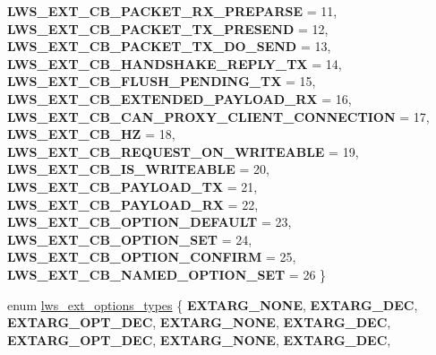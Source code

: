\begin{DoxyCompactItemize}
{\bfseries L\+W\+S\+\_\+\+E\+X\+T\+\_\+\+C\+B\+\_\+\+P\+A\+C\+K\+E\+T\+\_\+\+R\+X\+\_\+\+P\+R\+E\+P\+A\+R\+SE} = 11, 
{\bfseries L\+W\+S\+\_\+\+E\+X\+T\+\_\+\+C\+B\+\_\+\+P\+A\+C\+K\+E\+T\+\_\+\+T\+X\+\_\+\+P\+R\+E\+S\+E\+ND} = 12, 
\newline
{\bfseries L\+W\+S\+\_\+\+E\+X\+T\+\_\+\+C\+B\+\_\+\+P\+A\+C\+K\+E\+T\+\_\+\+T\+X\+\_\+\+D\+O\+\_\+\+S\+E\+ND} = 13, 
{\bfseries L\+W\+S\+\_\+\+E\+X\+T\+\_\+\+C\+B\+\_\+\+H\+A\+N\+D\+S\+H\+A\+K\+E\+\_\+\+R\+E\+P\+L\+Y\+\_\+\+TX} = 14, 
{\bfseries L\+W\+S\+\_\+\+E\+X\+T\+\_\+\+C\+B\+\_\+\+F\+L\+U\+S\+H\+\_\+\+P\+E\+N\+D\+I\+N\+G\+\_\+\+TX} = 15, 
{\bfseries L\+W\+S\+\_\+\+E\+X\+T\+\_\+\+C\+B\+\_\+\+E\+X\+T\+E\+N\+D\+E\+D\+\_\+\+P\+A\+Y\+L\+O\+A\+D\+\_\+\+RX} = 16, 
\newline
{\bfseries L\+W\+S\+\_\+\+E\+X\+T\+\_\+\+C\+B\+\_\+\+C\+A\+N\+\_\+\+P\+R\+O\+X\+Y\+\_\+\+C\+L\+I\+E\+N\+T\+\_\+\+C\+O\+N\+N\+E\+C\+T\+I\+ON} = 17, 
{\bfseries L\+W\+S\+\_\+\+E\+X\+T\+\_\+\+C\+B\+\_\+HZ} = 18, 
{\bfseries L\+W\+S\+\_\+\+E\+X\+T\+\_\+\+C\+B\+\_\+\+R\+E\+Q\+U\+E\+S\+T\+\_\+\+O\+N\+\_\+\+W\+R\+I\+T\+E\+A\+B\+LE} = 19, 
{\bfseries L\+W\+S\+\_\+\+E\+X\+T\+\_\+\+C\+B\+\_\+\+I\+S\+\_\+\+W\+R\+I\+T\+E\+A\+B\+LE} = 20, 
\newline
{\bfseries L\+W\+S\+\_\+\+E\+X\+T\+\_\+\+C\+B\+\_\+\+P\+A\+Y\+L\+O\+A\+D\+\_\+\+TX} = 21, 
{\bfseries L\+W\+S\+\_\+\+E\+X\+T\+\_\+\+C\+B\+\_\+\+P\+A\+Y\+L\+O\+A\+D\+\_\+\+RX} = 22, 
{\bfseries L\+W\+S\+\_\+\+E\+X\+T\+\_\+\+C\+B\+\_\+\+O\+P\+T\+I\+O\+N\+\_\+\+D\+E\+F\+A\+U\+LT} = 23, 
{\bfseries L\+W\+S\+\_\+\+E\+X\+T\+\_\+\+C\+B\+\_\+\+O\+P\+T\+I\+O\+N\+\_\+\+S\+ET} = 24, 
\newline
{\bfseries L\+W\+S\+\_\+\+E\+X\+T\+\_\+\+C\+B\+\_\+\+O\+P\+T\+I\+O\+N\+\_\+\+C\+O\+N\+F\+I\+RM} = 25, 
{\bfseries L\+W\+S\+\_\+\+E\+X\+T\+\_\+\+C\+B\+\_\+\+N\+A\+M\+E\+D\+\_\+\+O\+P\+T\+I\+O\+N\+\_\+\+S\+ET} = 26
 \}
\item 
enum \hyperlink{group__extensions_gacc9f55936dc165257a2e1f7d47bce89e}{lws\+\_\+ext\+\_\+options\+\_\+types} \{ \newline
{\bfseries E\+X\+T\+A\+R\+G\+\_\+\+N\+O\+NE}, 
{\bfseries E\+X\+T\+A\+R\+G\+\_\+\+D\+EC}, 
{\bfseries E\+X\+T\+A\+R\+G\+\_\+\+O\+P\+T\+\_\+\+D\+EC}, 
{\bfseries E\+X\+T\+A\+R\+G\+\_\+\+N\+O\+NE}, 
\newline
{\bfseries E\+X\+T\+A\+R\+G\+\_\+\+D\+EC}, 
{\bfseries E\+X\+T\+A\+R\+G\+\_\+\+O\+P\+T\+\_\+\+D\+EC}, 
{\bfseries E\+X\+T\+A\+R\+G\+\_\+\+N\+O\+NE}, 
{\bfseries E\+X\+T\+A\+R\+G\+\_\+\+D\+EC}, 
\newline

\end{DoxyCompactItemize}
